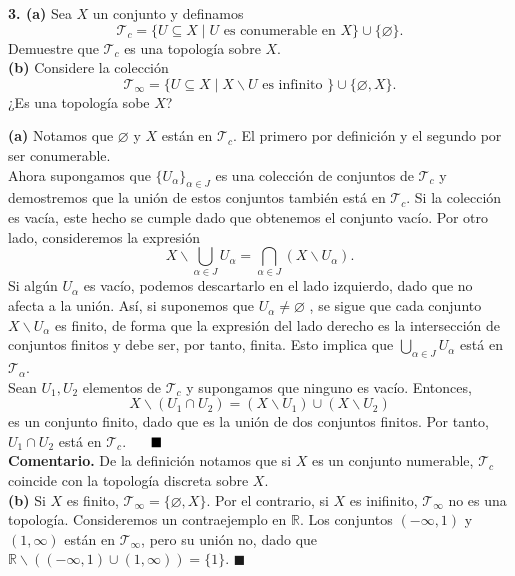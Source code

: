 \documentclass{article}
\begin{document}
\begin{mybox}
	\textbf{3. (a)} Sea $X$ un conjunto y definamos 
	$$ \mathcal{T}_{c} =\{ U \subseteq X \mid U \text{ es conumerable en }X \} \cup \{\varnothing \}. $$
	Demuestre que $\mathcal{T}_{c}$ es una topología sobre $X$. \\

	\textbf{(b)} Considere la colección 
	$$ \mathcal{T}_{\infty} = \{ U \subseteq X \mid X \backslash U \text{ es infinito } \} \cup \{ \varnothing, X \}. $$
¿Es una topología sobe $X$?
\end{mybox}	

\textbf{(a)} Notamos que $\varnothing$ y $X$ están en $\mathcal{T}_{c}$. El primero por definición y el segundo por ser conumerable. \\
Ahora supongamos que $\{ U_{\alpha}\}_{\alpha \in J}$ es una colección de conjuntos de $\mathcal{T}_{c}$ y demostremos que la unión de estos conjuntos también está en $\mathcal{T}_{c}$. Si la colección es vacía, este hecho se cumple dado que obtenemos el conjunto vacío. Por otro lado, consideremos la expresión
$$ X \backslash \bigcup_{\alpha \in J} U_{\alpha} = \bigcap_{\alpha \in J} (X \backslash U_{\alpha}). $$ 
Si algún $U_{\alpha}$ es vacío, podemos descartarlo en el lado izquierdo, dado que no afecta a la unión. Así, si suponemos que $U_{\alpha} \neq \varnothing$ , se sigue que cada conjunto $X \backslash U_{\alpha}$ es finito, de forma que la expresión del lado derecho es la intersección de conjuntos finitos y debe ser, por tanto, finita. Esto implica que $\bigcup_{\alpha \in J} U_{\alpha}$ está en $\mathcal{T}_{\alpha}$.\\
Sean $U_{1}, U_{2}$ elementos de $\mathcal{T}_{c}$ y supongamos que ninguno es vacío. Entonces,
$$ X \backslash (U_{1} \cap U_{2}) = (X \backslash U_{1}) \cup (X \backslash U_{2}) $$
es un conjunto finito, dado que es la unión de dos conjuntos finitos. Por tanto, $U_{1} \cap U_{2}$ está en $\mathcal{T}_{c}$. $ \hspace{0.5cm} \blacksquare $\\

\textbf{Comentario. } De la definición notamos que si $X$ es un conjunto numerable, $\mathcal{T}_{c}$ coincide con la topología discreta sobre $X$.\\

\textbf{(b)} Si $X$ es finito, $\mathcal{T}_{\infty} = \{ \varnothing, X \}$. Por el contrario, si $X$ es inifinito, $\mathcal{T}_{\infty}$ no es una topología. Consideremos un contraejemplo en $\mathbb{R}$. Los conjuntos $(-\infty, 1)$ y $(1, \infty )$ están en $\mathcal{T}_{\infty}$, pero su unión no, dado que $\mathbb{R} \backslash ( (- \infty, 1) \cup (1, \infty) ) = \{ 1 \}$. \hspace{0.5cm} $\blacksquare$
\end{document}
